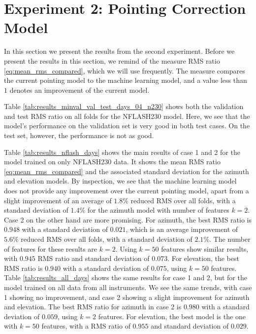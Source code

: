 \section{Experiment 2: Pointing Correction Model}
In this section we present the results from the second experiment.
Before we present the results in this section, we remind of the measure RMS ratio \eqref{eq:mean_rms_compared}, which we will use frequently.
The measure compares the current pointing model to the machine learning model, and a value less than $1$ denotes an improvement of the current model.

Table \ref{tab:results_minval_val_test_days_04_n230} shows both the validation and test RMS ratio on all folds for the NFLASH230 model.
Here, we see that the model's performance on the validation set is very good in both test cases.
On the test set, however, the performance is not as good. 

Table \ref{tab:results_nflash_days} shows the main results of case 1 and 2 for the model trained on only NFLASH230 data.
It shows the mean RMS ratio \eqref{eq:mean_rms_compared} and the associated standard deviation for the azimuth and elevation models.
By inspection, we see that the machine learning model does not provide any improvement over the current pointing model,
apart from a slight improvement of an average of $1.8\%$ reduced RMS over all folds, with a standard deviation of $1.4\%$ for the azimuth model with number of features $k=2$.\\

Case 2 on the other hand are more promising. For azimuth, the best RMS ratio is $0.948$ with a standard deviation of $0.021$,
which is an average improvement of $5.6\%$ reduced RMS over all folds, with a standard deviation of $2.1\%$. 
The number of features for these results are $k=2$. Using $k=50$ features show similar results, with $0.945$ RMS ratio and standard deviation of $0.073$.
For elevation, the best RMS ratio is $0.940$ with a standard deviation of $0.075$, using $k=50$ features.\\

Table \ref{tab:results_all_days} shows the same results for case 1 and 2, but for the model trained on all data from all instruments.
We see the same trends, with case 1 showing no improvement, and case 2 showing a slight improvement for azimuth and elevation.
The best RMS ratio for azimuth in case 2 is $0.980$ with a standard deviation of $0.059$, using $k=2$ features.
For elevation, the best model is the one with $k=50$ features, with a RMS ratio of $0.955$ and standard deviation of $0.029$.\\

